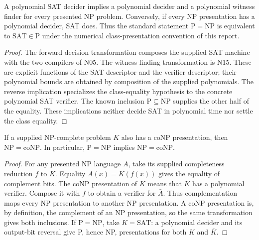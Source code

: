 \begin{theorem}\label{thm:N16}
A polynomial SAT decider implies a polynomial decider and a polynomial witness
finder for every presented NP problem. Conversely, if every NP presentation
has a polynomial decider, SAT does. Thus the standard statement
$\mathrm P=\mathrm{NP}$ is equivalent to $\mathrm{SAT}\in\mathrm P$ under the
numerical class-presentation convention of this report.
\end{theorem}
\begin{proof}
The forward decision transformation composes the supplied SAT machine with
the two compilers of N05. The witness-finding transformation is N15. These
are explicit functions of the SAT descriptor and the verifier descriptor;
their polynomial bounds are obtained by composition of the supplied
polynomials. The reverse implication specializes the class-equality
hypothesis to the concrete polynomial SAT verifier. The known inclusion
$\mathrm P\subseteq\mathrm{NP}$ supplies the other half of the equality.
These implications neither decide SAT in polynomial time nor settle the
class equality.
\end{proof}

\begin{theorem}\label{thm:N17}
If a supplied NP-complete problem $K$ also has a coNP presentation, then
$\mathrm{NP}=\mathrm{coNP}$. In particular, $\mathrm P=\mathrm{NP}$ implies
$\mathrm{NP}=\mathrm{coNP}$.
\end{theorem}
\begin{proof}
For any presented NP language $A$, take its supplied completeness reduction
$f$ to $K$. Equality $A(x)=K(f(x))$ gives the equality of complement bits.
The coNP presentation of $K$ means that $\bar K$ has a polynomial verifier.
Compose it with $f$ to obtain a verifier for $\bar A$. Thus complementation
maps every NP presentation to another NP presentation. A coNP presentation
is, by definition, the complement of an NP presentation, so the same
transformation gives both inclusions. If $\mathrm P=\mathrm{NP}$, take
$K=\mathrm{SAT}$: a polynomial decider and its output-bit reversal give P,
hence NP, presentations for both $K$ and $\bar K$.
\end{proof}

